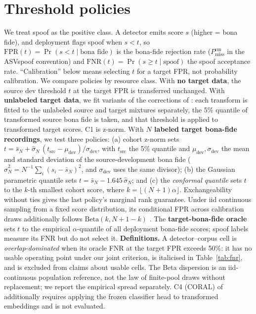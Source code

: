 \documentclass{article}
\begin{document}
\section{Threshold policies}
\label{sec:method}
We treat spoof as the positive class. A detector emits score $s$ (higher = bona fide), and deployment flags spoof when $s<t$, so $\mathrm{FPR}(t)=\Pr(s<t\mid\text{bona fide})$ is the bona-fide rejection rate ($P^{\mathrm{cm}}_{\mathrm{miss}}$ in the ASVspoof convention) and $\mathrm{FNR}(t)=\Pr(s\ge t\mid\text{spoof})$ the spoof acceptance rate. ``Calibration'' below means selecting $t$ for a target FPR, not probability calibration. We compare policies by resource class. With \textbf{no target data}, the source dev threshold $t$ at the target FPR is transferred unchanged. With \textbf{unlabeled target data}, we fit variants of the corrections of \cite{eerhides26}: each transform is fitted to the unlabeled source and target mixtures separately, the 5\% quantile of transformed source bona fide is taken, and that threshold is applied to transformed target scores. C1 is z-norm. With \textbf{$N$ labeled target bona-fide recordings}, we test three policies: (a) cohort z-norm sets $t=\bar s_N+\hat\sigma_N\,(t_{\mathrm{src}}-\mu_{\mathrm{dev}})/\sigma_{\mathrm{dev}}$, with $t_{\mathrm{src}}$ the 5\% quantile and $\mu_{\mathrm{dev}},\sigma_{\mathrm{dev}}$ the mean and standard deviation of the source-development bona fide ($\hat\sigma_N^2=N^{-1}\sum_i(s_i-\bar s_N)^2$, and $\sigma_{\mathrm{dev}}$ uses the same divisor); (b) the Gaussian parametric quantile sets $t=\bar s_N - 1.645\,\hat\sigma_N$; and (c) the \emph{conformal quantile} sets $t$ to the $k$-th smallest cohort score, where $k=\lfloor(N{+}1)\alpha\rfloor$. Exchangeability without ties gives the last policy's marginal rank guarantee. Under iid continuous sampling from a fixed score distribution, its conditional FPR across calibration draws additionally follows $\mathrm{Beta}(k, N{+}1{-}k)$ \cite{tong18,vovk}. The \textbf{target-bona-fide oracle} sets $t$ to the empirical $\alpha$-quantile of all deployment bona-fide scores; spoof labels measure its FNR but do not select it.
\textbf{Definitions.} A detector--corpus cell is \emph{overlap-dominated} when its oracle FNR at the target FPR exceeds 50\%: it has no usable operating point under our joint criterion, is italicised in Table~\ref{tab:fnr}, and is excluded from claims about usable cells. The Beta dispersion is an iid-continuous population reference, not the law of finite-pool draws without replacement; we report the empirical spread separately. C4 (CORAL) of \cite{eerhides26} additionally requires applying the frozen classifier head to transformed embeddings and is not evaluated.
\end{document}
